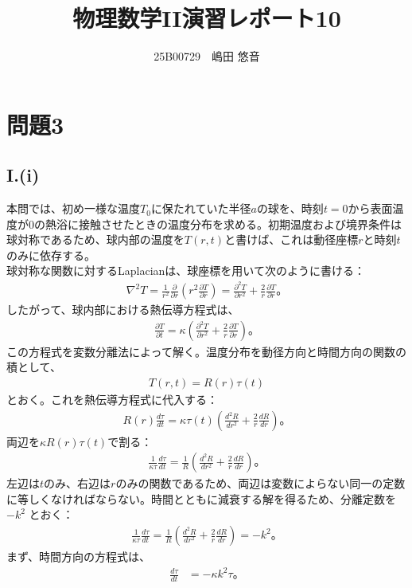 \documentclass[platex,dvipdfmx,a4paper]{jsarticle}
\title{物理数学II演習レポート10}
\author{25B00729　嶋田 悠音}
\newcommand{\hb}[2]{\frac{\partial #1}{\partial #2}}
\newcommand{\bbn}[2]{\frac{d #1}{d #2}}
\newcommand{\nhb}[3]{\frac{\partial^{#1} #2}{\partial #3^{#1}}}
\newcommand{\nbbn}[3]{\frac{d^{#1} #2}{d #3^{#1}}}
\begin{document}
  \maketitle
  \section*{問題3}

  \subsection*{I.(i)}
  
  本問では、初め一様な温度$T_0$に保たれていた半径$a$の球を、時刻$t=0$から表面温度が$0$の熱浴に接触させたときの温度分布を求める。初期温度および境界条件は球対称であるため、球内部の温度を$T(r,t)$と書けば、これは動径座標$r$と時刻$t$のみに依存する。\\
  球対称な関数に対するLaplacianは、球座標を用いて次のように書ける：
  \begin{align*}
    \nabla^2T=\frac{1}{r^2}\hb{}{r}\left(r^2\hb{T}{r}\right)=\nhb{2}{T}{r}+\frac{2}{r}\hb{T}{r}。
  \end{align*}
  したがって、球内部における熱伝導方程式は、
  \begin{align*}
    \hb{T}{t}=\kappa\left(\nhb{2}{T}{r}+\frac{2}{r}\hb{T}{r}\right)。
  \end{align*}
  この方程式を変数分離法によって解く。温度分布を動径方向と時間方向の関数の積として、
  \begin{align*}
    T(r,t)=R(r)\tau(t)
  \end{align*}
  とおく。これを熱伝導方程式に代入する：
  \begin{align*}
    R(r)\bbn{\tau}{t}=\kappa\tau(t)\left(\nbbn{2}{R}{r}+\frac{2}{r}\bbn{R}{r}\right)。
  \end{align*}
  両辺を$\kappa R(r)\tau(t)$で割る：
  \begin{align*}
    \frac{1}{\kappa\tau}\bbn{\tau}{t}=\frac{1}{R}\left(\nbbn{2}{R}{r}+\frac{2}{r}\bbn{R}{r}\right)。
  \end{align*}
  左辺は$t$のみ、右辺は$r$のみの関数であるため、両辺は変数によらない同一の定数に等しくなければならない。時間とともに減衰する解を得るため、分離定数を $-k^2$ とおく：
  \begin{align*}
    \frac{1}{\kappa\tau}\bbn{\tau}{t}=\frac{1}{R}\left(\nbbn{2}{R}{r}+\frac{2}{r}\bbn{R}{r}\right)=-k^2。
  \end{align*}
  まず、時間方向の方程式は、
  \begin{align*}
    \bbn{\tau}{t}&=-\kappa k^2\tau。
  \end{align*}
\end{document}
